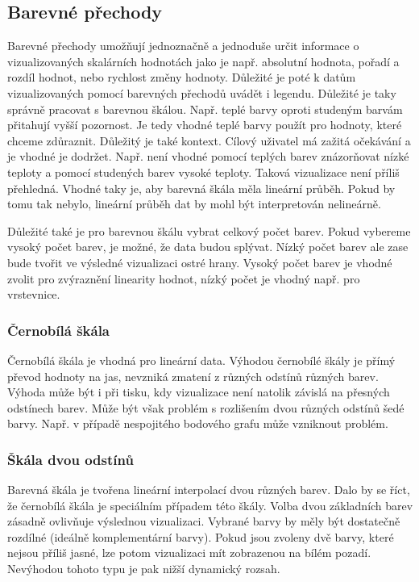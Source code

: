 \documentclass[10pt,a4paper, table]{article}
\begin{document}
\subsection{Barevné přechody}
Barevné přechody umožňují jednoznačně a jednoduše určit informace o vizualizovaných skalárních hodnotách jako je např. absolutní hodnota, pořadí a rozdíl hodnot, nebo rychlost změny hodnoty. Důležité je poté k datům vizualizovaných pomocí barevných přechodů uvádět i legendu. Důležité je taky správně pracovat s barevnou škálou. Např. teplé barvy oproti studeným barvám přitahují vyšší pozornost. Je tedy vhodné teplé barvy použít pro hodnoty, které chceme zdůraznit. Důležitý je také kontext. Cílový uživatel má zažitá očekávání a je vhodné je dodržet. Např. není vhodné pomocí teplých barev znázorňovat nízké teploty a pomocí studených barev vysoké teploty. Taková vizualizace není příliš přehledná. Vhodné taky je, aby barevná škála měla lineární průběh. Pokud by tomu tak nebylo, lineární průběh dat by mohl být interpretován nelineárně. \par
Důležité také je pro barevnou škálu vybrat celkový počet barev. Pokud vybereme vysoký počet barev, je možné, že data budou splývat. Nízký počet barev ale zase bude tvořit ve výsledné vizualizaci ostré hrany. Vysoký počet barev je vhodné zvolit pro zvýraznění linearity hodnot, nízký počet je vhodný např. pro vrstevnice.
\subsubsection{Černobílá škála}
Černobílá škála je vhodná pro lineární data. Výhodou černobílé škály je přímý převod hodnoty na jas, nevzniká zmatení z různých odstínů různých barev. Výhoda může být i při tisku, kdy vizualizace není natolik závislá na přesných odstínech barev. Může být však problém s rozlišením dvou různých odstínů šedé barvy. Např. v případě nespojitého bodového grafu může vzniknout problém.
\subsubsection{Škála dvou odstínů}
Barevná škála je tvořena lineární interpolací dvou různých barev. Dalo by se říct, že černobílá škála je speciálním případem této škály. Volba dvou základních barev zásadně ovlivňuje výslednou vizualizaci. Vybrané barvy by měly být dostatečně rozdílné (ideálně komplementární barvy). Pokud jsou zvoleny dvě barvy, které nejsou příliš jasné, lze potom vizualizaci mít zobrazenou na bílém pozadí. Nevýhodou tohoto typu je pak nižší dynamický rozsah.
\end{document}
